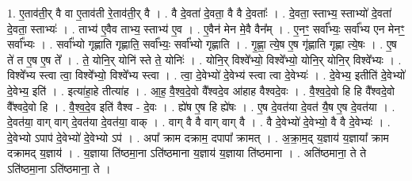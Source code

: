 \documentclass[17pt]{extarticle}
\begin{document}
1. ए॒ताव॑ती॒र् वै वा ए॒ताव॑ती रे॒ताव॑ती॒र् वै । . वै दे॒वता॑ दे॒वता॒ वै वै दे॒वताः᳚ । . दे॒वता॒ स्ताभ्य॒ स्ताभ्यो॑ दे॒वता॑ दे॒वता॒ स्ताभ्यः॑ । . ताभ्य॑ ए॒वैव ताभ्य॒ स्ताभ्य॑ ए॒व । . ए॒वैन॑ मेन मे॒वै वैन᳚म् । . ए॒नꣳ॒॒ सर्वा᳚भ्यः॒ सर्वा᳚भ्य एन मेनꣳ॒॒ सर्वा᳚भ्यः । . सर्वा᳚भ्यो गृह्णाति गृह्णाति॒ सर्वा᳚भ्यः॒ सर्वा᳚भ्यो गृह्णाति । . गृ॒ह्णा॒ त्ये॒ष ए॒ष गृ॑ह्णाति गृह्णा त्ये॒षः । . ए॒ष ते॑ त ए॒ष ए॒ष ते᳚ । . ते॒ योनि॒र् योनि॑ स्ते ते॒ योनिः॑ । . योनि॒र् विश्वे᳚भ्यो॒ विश्वे᳚भ्यो॒ योनि॒र् योनि॒र् विश्वे᳚भ्यः । . विश्वे᳚भ्य स्त्वा त्वा॒ विश्वे᳚भ्यो॒ विश्वे᳚भ्य स्त्वा । . त्वा॒ दे॒वेभ्यो॑ दे॒वेभ्य॑ स्त्वा त्वा दे॒वेभ्यः॑ । . दे॒वेभ्य॒ इतीति॑ दे॒वेभ्यो॑ दे॒वेभ्य॒ इति॑ । . इत्या॑हा॒हे तीत्या॑ह । . आ॒ह॒ वै॒श्व॒दे॒वो वै᳚श्वदे॒व आ॑हाह वैश्वदे॒वः । . वै॒श्व॒दे॒वो हि हि वै᳚श्वदे॒वो वै᳚श्वदे॒वो हि । . वै॒श्व॒दे॒व इति॑ वैश्व - दे॒वः । . ह्ये॑ष ए॒ष हि ह्ये॑षः । . ए॒ष दे॒वत॑या दे॒वत॑ यै॒ष ए॒ष दे॒वत॑या । . दे॒वत॑या॒ वाग् वाग् दे॒वत॑या दे॒वत॑या॒ वाक् । . वाग् वै वै वाग् वाग् वै । . वै दे॒वेभ्यो॑ दे॒वेभ्यो॒ वै वै दे॒वेभ्यः॑ । . दे॒वेभ्यो ऽपाप॑ दे॒वेभ्यो॑ दे॒वेभ्यो ऽप॑ । . अपा᳚ क्राम दक्राम॒ दपापा᳚ क्रामत् । . अ॒क्रा॒म॒द् य॒ज्ञाय॑ य॒ज्ञाया᳚ क्राम दक्रामद् य॒ज्ञाय॑ । . य॒ज्ञाया ति॑ष्ठमा॒ना ऽति॑ष्ठमाना य॒ज्ञाय॑ य॒ज्ञाया ति॑ष्ठमाना । . अति॑ष्ठमाना॒ ते ते ऽति॑ष्ठमा॒ना ऽति॑ष्ठमाना॒ ते । \newline
\end{document}
